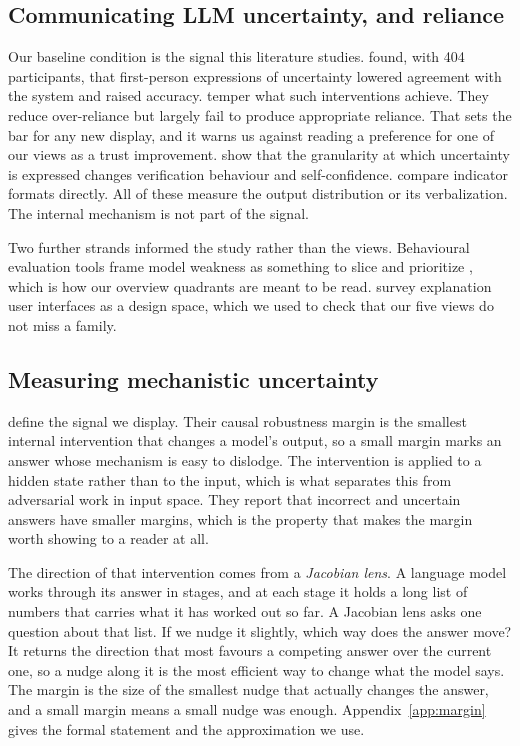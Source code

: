 \documentclass[sigconf]{acmart}
\begin{document}
\subsection{Communicating LLM uncertainty, and reliance}

Our baseline condition is the signal this literature studies. \citet{kimImNotSure2024} found, with 404
participants, that first-person expressions of uncertainty lowered agreement with the system and raised
accuracy. \citet{boRelyNotRely2024} temper what such interventions achieve. They reduce over-reliance but
largely fail to produce appropriate reliance. That sets the bar for any new display, and it warns us against
reading a preference for one of our views as a trust improvement.
\citet{villavicencioNotAllUncertainty2026} show that the granularity at which uncertainty is expressed changes
verification behaviour and self-confidence. \citet{warrenWhenShouldTrust2026} compare indicator formats
directly. All of these measure the output distribution or its verbalization. The internal mechanism is not part
of the signal.

Two further strands informed the study rather than the views. Behavioural evaluation tools frame model weakness
as something to slice and prioritize \cite{cabreraZenoInteractiveFramework2023,robertsonAnglerHelpingMachine2023},
which is how our overview quadrants are meant to be read.
\citet{cappuccioExplanationUserInterfaces2025} survey explanation user interfaces as a design space, which we
used to check that our five views do not miss a family.

\subsection{Measuring mechanistic uncertainty}

\citet{komanduriMeasuringMechanisticUncertainty2026} define the signal we display. Their causal robustness
margin is the smallest internal intervention that changes a model's output, so a small margin marks an answer
whose mechanism is easy to dislodge. The intervention is applied to a hidden state rather than to the input,
which is what separates this from adversarial work in input space. They report that incorrect and uncertain
answers have smaller margins, which is the property that makes the margin worth showing to a reader at all.

The direction of that intervention comes from a \emph{Jacobian lens}. A language model works through its
answer in stages, and at each stage it holds a long list of numbers that carries what it has worked out so
far. A Jacobian lens asks one question about that list. If we nudge it slightly, which way does the answer
move? It returns the direction that most favours a competing answer over the current one, so a nudge along it
is the most efficient way to change what the model says. The margin is the size of the smallest nudge that
actually changes the answer, and a small margin means a small nudge was enough. Appendix~\ref{app:margin}
gives the formal statement and the approximation we use.
\end{document}
